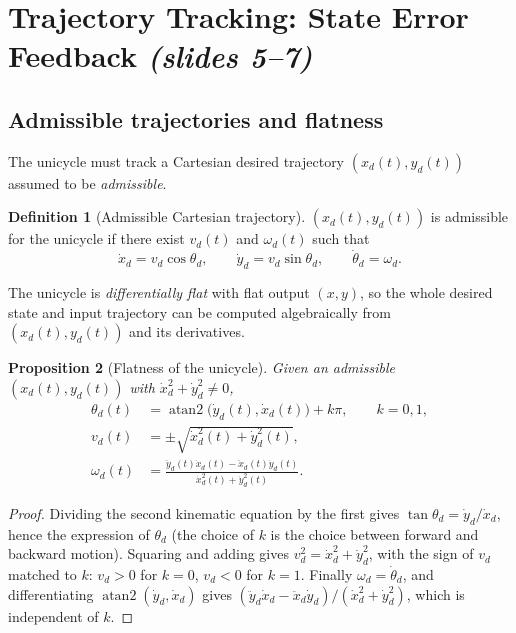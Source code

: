 \documentclass[11pt,a4paper]{article}
\DeclareMathOperator{\atan}{atan2}
\newcommand{\vd}{v_d}
\newcommand{\omd}{\omega_d}
\theoremstyle{definition}
\newtheorem{definition}{Definition}[section]
\theoremstyle{plain}
\newtheorem{proposition}[definition]{Proposition}
\theoremstyle{remark}
\begin{document}
\section{Trajectory Tracking: State Error Feedback \texorpdfstring{\emph{(slides 5--7)}}{(slides 5--7)}}

\subsection{Admissible trajectories and flatness}

The unicycle must track a Cartesian desired trajectory $(x_d(t),y_d(t))$ assumed to be \emph{admissible}.

\begin{definition}[Admissible Cartesian trajectory]
$(x_d(t),y_d(t))$ is admissible for the unicycle if there exist $\vd(t)$ and $\omd(t)$ such that
\[
\dot x_d=\vd\cos\theta_d,\qquad \dot y_d=\vd\sin\theta_d,\qquad \dot\theta_d=\omd .
\]
\end{definition}

The unicycle is \emph{differentially flat} with flat output $(x,y)$, so the whole desired state and input trajectory can be computed algebraically from $(x_d(t),y_d(t))$ and its derivatives.

\begin{proposition}[Flatness of the unicycle]\label{prop:flat}
Given an admissible $(x_d(t),y_d(t))$ with $\dot x_d^2+\dot y_d^2\neq0$,
\begin{align}
\theta_d(t)&=\atan\bigl(\dot y_d(t),\dot x_d(t)\bigr)+k\pi,\qquad k=0,1,\\
\vd(t)&=\pm\sqrt{\dot x_d^2(t)+\dot y_d^2(t)},\\
\omd(t)&=\frac{\ddot y_d(t)\dot x_d(t)-\ddot x_d(t)\dot y_d(t)}{\dot x_d^2(t)+\dot y_d^2(t)} .
\end{align}
\end{proposition}
\begin{proof}
Dividing the second kinematic equation by the first gives $\tan\theta_d=\dot y_d/\dot x_d$, hence the expression of $\theta_d$ (the choice of $k$ is the choice between forward and backward motion). Squaring and adding gives $\vd^2=\dot x_d^2+\dot y_d^2$, with the sign of $\vd$ matched to $k$: $\vd>0$ for $k=0$, $\vd<0$ for $k=1$. Finally $\omd=\dot\theta_d$, and differentiating $\atan(\dot y_d,\dot x_d)$ gives $(\ddot y_d\dot x_d-\ddot x_d\dot y_d)/(\dot x_d^2+\dot y_d^2)$, which is independent of $k$.
\end{proof}
\end{document}
